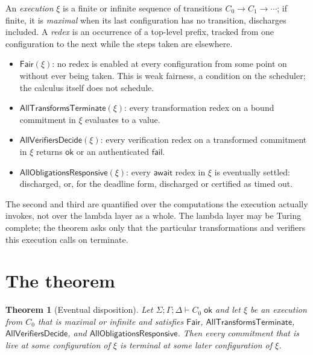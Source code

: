 \documentclass[11pt,openany]{book}
\newtheorem{theorem}{Theorem}[chapter]
\theoremstyle{remark}
\begin{document}
An \emph{execution} $\xi$ is a finite or infinite sequence of transitions
$C_0\to C_1\to\cdots$; if finite, it is \emph{maximal} when its last
configuration has no transition, discharges included. A \emph{redex} is an
occurrence of a top-level prefix, tracked from one configuration to the
next while the steps taken are elsewhere.
\begin{itemize}[leftmargin=1.5em]
\item $\mathsf{Fair}(\xi)$: no redex is enabled at every configuration
from some point on without ever being taken. This is weak fairness, a
condition on the scheduler; the calculus itself does not schedule.
\item $\mathsf{AllTransformsTerminate}(\xi)$: every transformation redex
on a bound commitment in $\xi$ evaluates to a value.
\item $\mathsf{AllVerifiersDecide}(\xi)$: every verification redex on a
transformed commitment in $\xi$ returns $\mathsf{ok}$ or an authenticated
$\mathsf{fail}$.
\item $\mathsf{AllObligationsResponsive}(\xi)$: every $\mathsf{await}$
redex in $\xi$ is eventually settled: discharged, or, for the deadline
form, discharged or certified as timed out.
\end{itemize}
The second and third are quantified over the computations the execution
actually invokes, not over the lambda layer as a whole. The lambda layer
may be Turing complete; the theorem asks only that the particular
transformations and verifiers this execution calls on terminate.

\section{The theorem}

\begin{theorem}[Eventual disposition]\label{thm:eventual}
Let $\Sigma;\Gamma;\Delta\vdash C_0\;\mathsf{ok}$ and let $\xi$ be an
execution from $C_0$ that is maximal or infinite and satisfies
$\mathsf{Fair}$, $\mathsf{AllTransformsTerminate}$,
$\mathsf{AllVerifiersDecide}$, and $\mathsf{AllObligationsResponsive}$.
Then every commitment that is live at some configuration of $\xi$ is
terminal at some later configuration of $\xi$.
\end{theorem}
\end{document}
